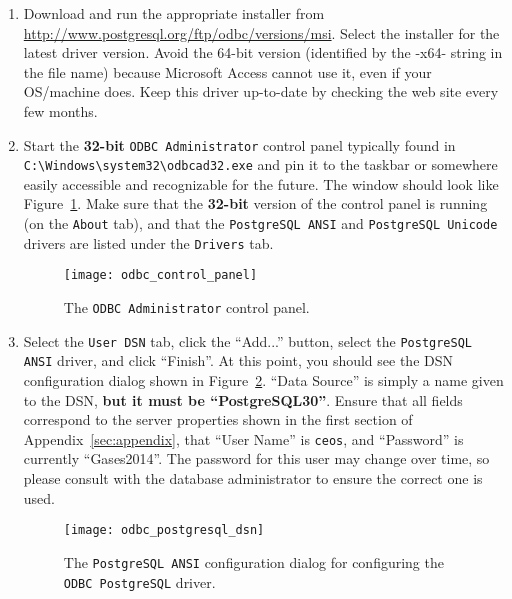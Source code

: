 \documentclass[12pt,letterpaper,titlepage,headings=small,numbers=noenddot]%
{scrartcl}
\begin{document}
\begin{enumerate}[\bfseries 1.]
\item Download and run the appropriate installer from
  \url{http://www.postgresql.org/ftp/odbc/versions/msi}.  Select the
  installer for the latest driver version.  Avoid the 64-bit version
  (identified by the -x64- string in the file name) because Microsoft
  Access cannot use it, even if your OS/machine does.  Keep this driver
  up-to-date by checking the web site every few months.
\item Start the \textbf{32-bit} \texttt{ODBC Administrator} control panel
  typically found in
  \lstinline[basicstyle=\small \ttfamily,
  breaklines=true]|C:\Windows\system32\odbcad32.exe| and pin it to the
  taskbar or somewhere easily accessible and recognizable for the future.
  The window should look like Figure~\ref{fig:odbc-admin}.  Make sure that
  the \textbf{32-bit} version of the control panel is running (on the
  \texttt{About} tab), and that the \texttt{PostgreSQL ANSI} and
  \texttt{PostgreSQL Unicode} drivers are listed under the \texttt{Drivers}
  tab.

  \begin{figure}[!tbh]
    \begin{center}
      \begin{minipage}[t]{0.5\textwidth}
        \texttt{[image: odbc\_control\_panel]}
        \caption{The \texttt{ODBC Administrator} control panel.}
        \label{fig:odbc-admin}
      \end{minipage}
    \end{center}
  \end{figure}

\item Select the \texttt{User DSN} tab, click the ``Add...'' button, select
  the \texttt{PostgreSQL ANSI} driver, and click ``Finish''.  At this
  point, you should see the DSN configuration dialog shown in
  Figure~\ref{fig:odbc-pgsql-config}.  ``Data Source'' is simply a name
  given to the DSN, \textbf{but it must be ``PostgreSQL30''}.  Ensure that
  all fields correspond to the server properties shown in the first section
  of Appendix~\ref{sec:appendix}, that ``User Name'' is \texttt{ceos}, and
  ``Password'' is currently ``Gases2014''.  The password for this user may
  change over time, so please consult with the database administrator to
  ensure the correct one is used.

  \begin{figure}[!tbh]
    \begin{center}
      \begin{minipage}[t]{0.5\textwidth}
        \texttt{[image: odbc\_postgresql\_dsn]}
        \caption{The \texttt{PostgreSQL ANSI} configuration dialog for
          configuring the \texttt{ODBC PostgreSQL} driver.}
        \label{fig:odbc-pgsql-config}
      \end{minipage}
    \end{center}
  \end{figure}


\end{enumerate}
\end{document}

